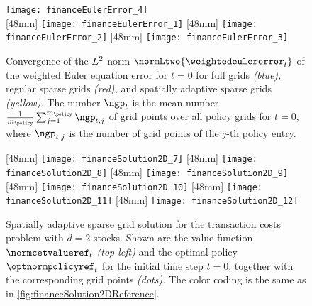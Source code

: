 \begin{figure}
  \texttt{[image: financeEulerError\_4]}%
  \\[2mm]%
  [48mm]{%
    \texttt{[image: financeEulerError\_1]}%
  }%
  \hfill%
  [48mm]{%
    \texttt{[image: financeEulerError\_2]}%
  }%
  \hfill%
  [48mm]{%
    \texttt{[image: financeEulerError\_3]}%
  }%
  \caption[Convergence of the weighted Euler equation error]{%
    Convergence of the $L^2$ norm $\normLtwo{\weightedeulererror_t}$
    of the weighted Euler equation error for $t = 0$ for
    full grids \emph{\textcolor{C0}{(blue)},}
    regular sparse grids \emph{\textcolor{C1}{(red)},} and
    spatially adaptive sparse grids \emph{\textcolor{C2}{(yellow)}.}
    The number $\ngp_t$ is the mean number
    $\frac{1}{m_{\policy}} \sum_{j=1}^{m_{\policy}} \ngp_{t,j}$
    of grid points over all policy grids for $t = 0$,
    where $\ngp_{t,j}$ is the number of grid points
    of the $j$-th policy entry.%
  }%
  \label{fig:financeEulerError}%
\end{figure}



\begin{figure}
  [48mm]{%
    \texttt{[image: financeSolution2D\_7]}%
  }%
  \hfill%
  [48mm]{%
    \texttt{[image: financeSolution2D\_8]}%
  }%
  \hfill%
  [48mm]{%
    \texttt{[image: financeSolution2D\_9]}%
  }%
  \\[2mm]%
  [48mm]{%
    \texttt{[image: financeSolution2D\_10]}%
  }%
  \hfill%
  [48mm]{%
    \texttt{[image: financeSolution2D\_11]}%
  }%
  \hfill%
  [48mm]{%
    \texttt{[image: financeSolution2D\_12]}%
  }%
  \caption[Sparse grid solution for the two-dimensional TCP]{%
    Spatially adaptive sparse grid solution for the transaction costs problem
    with $d = 2$ stocks.
    \vspace{-0.15em}%
    Shown are the value function $\normcetvalueref_t$ \emph{(top left)} and the
    optimal policy $\optnormpolicyref_t$ for the initial time step $t = 0$,
    together with the corresponding grid points \emph{(dots).}
    The color coding is the same as in
    \cref{fig:financeSolution2DReference}.%
  }%
  \label{fig:financeSolution2DSparseGrid}%
\end{figure}


